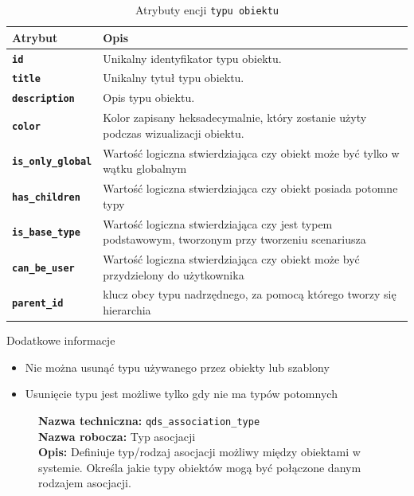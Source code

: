 \begin{table}[H]
    \centering
    \renewcommand{\arraystretch}{1.6}
    \begin{tabular}{|>{\bfseries}l|p{}|}
        \hline
        \rowcolor[HTML]{EFEFEF} \textbf{Atrybut} & \textbf{Opis} \\
        \hline
        \texttt{id} & Unikalny identyfikator typu obiektu. \\
        \hline
        \texttt{title} & Unikalny tytuł typu obiektu. \\
        \hline
        \texttt{description} & Opis typu obiektu. \\
        \hline
        \texttt{color} & Kolor zapisany heksadecymalnie, który zostanie użyty podczas wizualizacji obiektu. \\
        \hline
        \texttt{is\_only\_global} & Wartość logiczna stwierdziająca czy obiekt może być tylko w wątku globalnym \\
        \hline
        \texttt{has\_children} & Wartość logiczna stwierdziająca czy obiekt posiada potomne typy \\
        \hline
        \texttt{is\_base\_type} & Wartość logiczna stwierdziająca czy jest typem podstawowym, tworzonym przy tworzeniu scenariusza \\
        \hline
        \texttt{can\_be\_user} & Wartość logiczna stwierdziająca czy obiekt może być przydzielony do użytkownika \\
        \hline
        \texttt{parent\_id} & klucz obcy typu nadrzędnego, za pomocą którego tworzy się hierarchia \\
        \hline
    \end{tabular}
    \caption{Atrybuty encji \texttt{typu obiektu}}
\end{table}

Dodatkowe informacje
\begin{itemize}
    \item Nie można usunąć typu używanego przez obiekty lub szablony
    \item Usunięcie typu jest możliwe tylko gdy nie ma typów potomnych
\end{itemize}

\begin{figure}[H]
    \centering
    \begin{minipage}{0.8\textwidth} 
        \begin{framed}
            \noindent\textbf{\large Nazwa techniczna:} \texttt{qds\_association\_type} \\
            \textbf{\large Nazwa robocza:} Typ asocjacji \\
            \textbf{\large Opis:} Definiuje typ/rodzaj asocjacji możliwy między obiektami w systemie.
            Określa jakie typy obiektów mogą być połączone danym rodzajem asocjacji.
        \end{framed}
    \end{minipage}
\end{figure}

